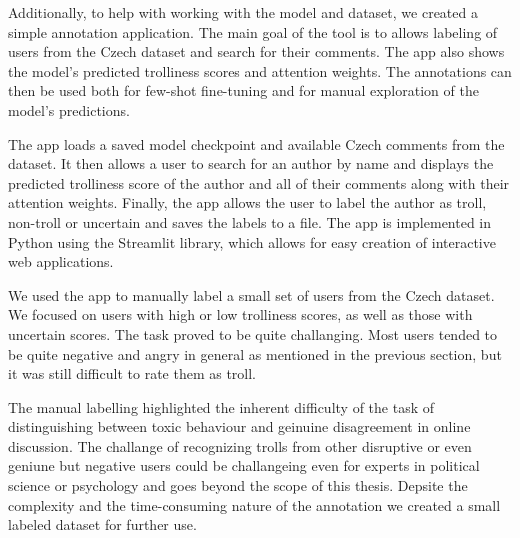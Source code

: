 \documentclass[twoside]{ctuthesis}
\theoremstyle{plain}
\theoremstyle{definition}
\theoremstyle{note}
\begin{document}
Additionally, to help with working with the model and dataset, we created a simple annotation application. The main goal of the tool is to allows labeling of users from the Czech dataset and search for their comments. The app also shows the model's predicted trolliness scores and attention weights. The annotations can then be used both for few-shot fine-tuning and for manual exploration of the model's predictions.\par
The app loads a saved model checkpoint and available Czech comments from the dataset. It then allows a user to search for an author by name and displays the predicted trolliness score of the author and all of their comments along with their attention weights. Finally, the app allows the user to label the author as troll, non-troll or uncertain and saves the labels to a file. The app is implemented in Python using the Streamlit library, which allows for easy creation of interactive web applications.\par
We used the app to manually label a small set of users from the Czech dataset. We focused on users with high or low trolliness scores, as well as those with uncertain scores. The task proved to be quite challanging. Most users tended to be quite negative and angry in general as mentioned in the previous section, but it was still difficult to rate them as troll. \par
The manual labelling highlighted the inherent difficulty of the task of distinguishing between toxic behaviour and geinuine disagreement in online discussion. The challange of recognizing trolls from other disruptive or even geniune but negative users could be challangeing even for experts in political science or psychology and goes beyond the scope of this thesis. Depsite the complexity and the time-consuming nature of the annotation we created a small labeled dataset for further use. \par
\end{document}
